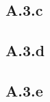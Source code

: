 \documentclass[]{article}
\begin{document}
        
    \subsection*{A.3.c}

    \subsection*{A.3.d}

    \subsection*{A.3.e}
    
    
\end{document}

